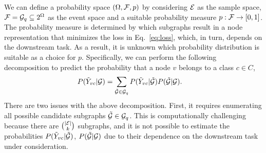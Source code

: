 We can define a probability space $(\Omega,{\mathcal{F}},p)$ by considering ${\mathcal{E}}$ as the sample space, ${\mathcal{F}} = {\mathcal{G}}_q \subseteq 2^{\Omega}$ as the event space and a suitable probability measure $p: {\mathcal{F}} \rightarrow [0,1]$. 
The probability measure is determined by which subgraphs result in a node representation that minimizes the loss in Eq.~\ref{eq:loss}, which, in turn, depends on the downstream task. As a result, it is unknown which probability distribution is suitable as a choice for $p$. Specifically, we can perform the following decomposition to predict the probability that a node $v$ belongs to a class $c\in C$,
% 
\vspace{-3pt}
\begin{align}
\label{eq:theo1}
P(\tilde{Y}_{vc}|{\mathcal{G}}) &= \sum_{\tilde{{\mathcal{G}}} \in {\mathcal{G}}_q} P(\tilde{Y}_{vc}|\tilde{{\mathcal{G}}})  P(\tilde{{\mathcal{G}}}|{\mathcal{G}}).
\end{align}
There are two issues with the above decomposition. First, it requires enumerating all possible candidate subgraphs $\tilde{{\mathcal{G}}} \in {\mathcal{G}}_q$. This is computationally challenging because there are $\binom{|{\mathcal{E}}|}{k}$ subgraphs, and it is not possible to estimate the probabilities $P(\tilde{Y}_{vc}|\tilde{{\mathcal{G}}})$,  $P(\tilde{{\mathcal{G}}}|{\mathcal{G}})$ due to their dependence on the downstream task under consideration.


